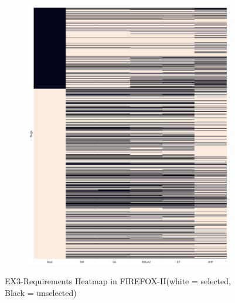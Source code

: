 \begin{figure}[h]
\centering
  \begin{subfigure}[b]{0.95\linewidth}
    \includegraphics[width=\linewidth]{images/heatmap_ff2.png}
  \end{subfigure}
  \caption{EX3-Requirements Heatmap in FIREFOX-II(white = selected, Black = unselected)}
  \label{fig:FirefoxIIHeatmap}
\end{figure}

